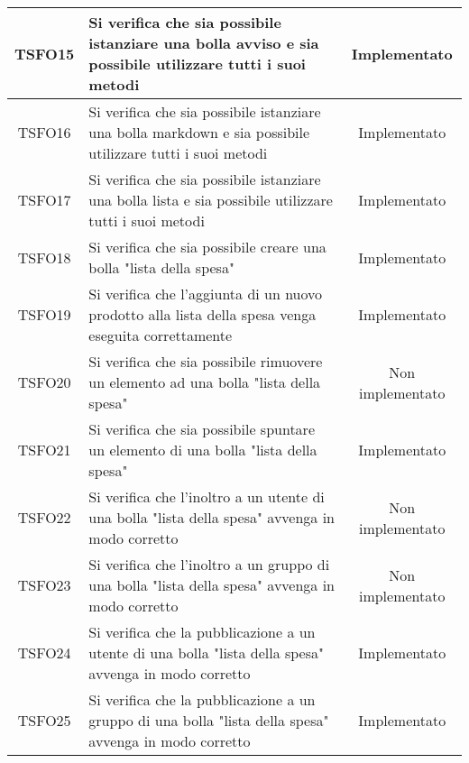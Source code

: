 \begin{center}
\begin{longtable}{|c|>{\centering}m{10cm}|c|}
		TSFO15 & Si verifica che sia possibile istanziare una bolla avviso e sia possibile utilizzare tutti i suoi metodi & Implementato \\ \hline
		TSFO16 & Si verifica che sia possibile istanziare una bolla markdown e sia possibile utilizzare tutti i suoi metodi & Implementato \\ \hline
		TSFO17 & Si verifica che sia possibile istanziare una bolla lista e sia possibile utilizzare tutti i suoi metodi & Implementato \\ \hline
		TSFO18 & Si verifica che sia possibile creare una bolla "lista della spesa" & Implementato \\ \hline
		TSFO19 & Si verifica che l'aggiunta di un nuovo prodotto alla lista della spesa venga eseguita correttamente & Implementato \\ \hline
		TSFO20 & Si verifica che sia possibile rimuovere un elemento ad una bolla "lista della spesa" & Non implementato \\ \hline
		TSFO21 & Si verifica che sia possibile spuntare un elemento di una bolla "lista della spesa" & Implementato \\ \hline
		TSFO22 & Si verifica che l'inoltro a un utente di una bolla "lista della spesa" avvenga in modo corretto & Non implementato \\ \hline
		TSFO23 & Si verifica che l'inoltro a un gruppo di una bolla "lista della spesa" avvenga in modo corretto & Non implementato \\ \hline
		TSFO24 & Si verifica che la pubblicazione a un utente di una bolla "lista della spesa" avvenga in modo corretto & Implementato \\ \hline
		TSFO25 & Si verifica che la pubblicazione a un gruppo di una bolla "lista della spesa" avvenga in modo corretto & Implementato \\ \hline
	\end{longtable}
\end{center}
